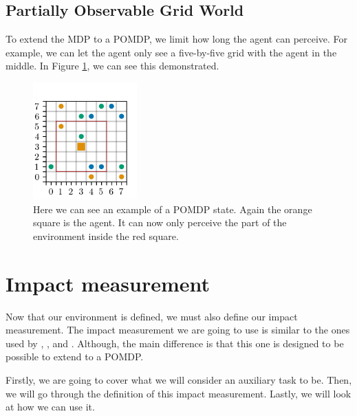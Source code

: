 \documentclass[12pt,A4]{report}
\theoremstyle{definition}
\begin{document}
\subsection{Partially Observable Grid World}
To extend the MDP to a POMDP, we limit how long the agent can perceive. For example, we can let the agent only see a five-by-five grid with the agent in the middle. In Figure \ref{fig:redline}, we can see this demonstrated. 

\begin{figure}[H]
  \centering
  \includegraphics[width=4cm]{"./figures/redline.png"}
  \caption{Here we can see an example of a POMDP state. Again the orange square is the agent. It can now only perceive the part of the environment inside the red square.}
  \label{fig:redline}
\end{figure}


\section{Impact measurement}
Now that our environment is defined, we must also define our impact measurement. The impact measurement we are going to use is similar to the ones used by \citet{Turner19}, \citet{Krakovna19}, and \citet{Krakovna20}. Although, the main difference is that this one is designed to be possible to extend to a POMDP.

Firstly, we are going to cover what we will consider an auxiliary task to be. Then, we will go through the definition of this impact measurement. Lastly, we will look at how we can use it. 

\end{document}
